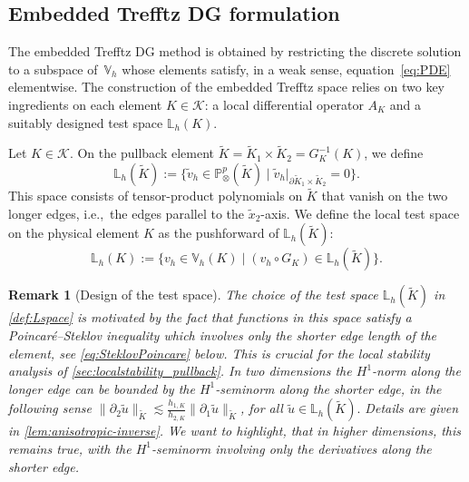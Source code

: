 \documentclass[a4paper,twoside,10pt]{article}
\newtheorem{remark}[theorem]{Remark}
\newcommand{\LKh}{\mathbb{L}_h(K)}
\newcommand{\IL}{\mathbb{L}}
\newcommand{\IP}{\mathbb{P}}
\newcommand{\calK}{\mathcal{K}}
\numberwithin{equation}{section}
\newcommand{\Vh}{\mathbb{V}_{\! h}}
\newcommand{\Kt}{\widetilde{K}}
\newcommand{\hKot}{h_{1,K}}
\newcommand{\hKtt}{h_{2,K}}
\begin{document}
	
	\subsection{Embedded Trefftz DG formulation}\label{ssec:TDGformulation}
	The embedded Trefftz DG method is obtained by restricting the
	discrete solution to a subspace of~$\Vh$ whose elements satisfy,
	in a weak sense,
    equation~\eqref{eq:PDE} elementwise.
	The construction of the embedded Trefftz space relies on two key ingredients on each element $K \in \calK$: a local differential operator $A_K$ and a suitably designed test space $\IL_h(K)$.

	Let $K\in \calK$.
	On the pullback element $\Kt = \Kt_1 \times \Kt_2=G_K^{-1}(K)$, we define
	\begin{equation}\label{def:Lspace}
		\IL_h(\Kt) := \{\tilde v_h \in \IP^p_\otimes(\Kt) \mid \tilde v_h|_{\partial \Kt_1 \times \Kt_2} = 0\}.
	\end{equation}
This space consists of tensor-product polynomials on $\Kt$ that vanish on the two longer edges, i.e.,\ the edges parallel to the $\widetilde x_2$-axis.
We define the local test space on the physical element $K$ as the pushforward of $\IL_h(\Kt)$:
	\begin{equation*}
		\LKh := \{v_h \in \Vh(K) \mid (v_h\circ G_K) \in \IL_h(\Kt)\}.
	\end{equation*}
    \begin{remark}[Design of the test space]\label{rem:testspace}
        The choice of the test space $\IL_h(\Kt)$ in \eqref{def:Lspace} is motivated by the fact that functions in this space satisfy a Poincaré--Steklov inequality which involves only the shorter edge length of the element, see \eqref{eq:SteklovPoincare} below. 
        This is crucial for the	
        local stability 
        analysis of \cref{sec:localstability_pullback}. 
        In two dimensions the $H^1$-norm along the longer edge can be bounded by the $H^1$-seminorm along the shorter edge, in the following sense 
        $\|\partial_2 \tilde u\|_{\Kt} \lesssim \frac{\hKot}{\hKtt} \|\partial_1 \tilde u\|_{\Kt}$, for all $\tilde u \in \IL_h(\Kt).$
        Details are given in \cref{lem:anisotropic-inverse}.
        We want to highlight, that in higher dimensions, this remains true, with the $H^1$-seminorm involving only the derivatives along the shorter edge.
	\end{remark}
\end{document}
